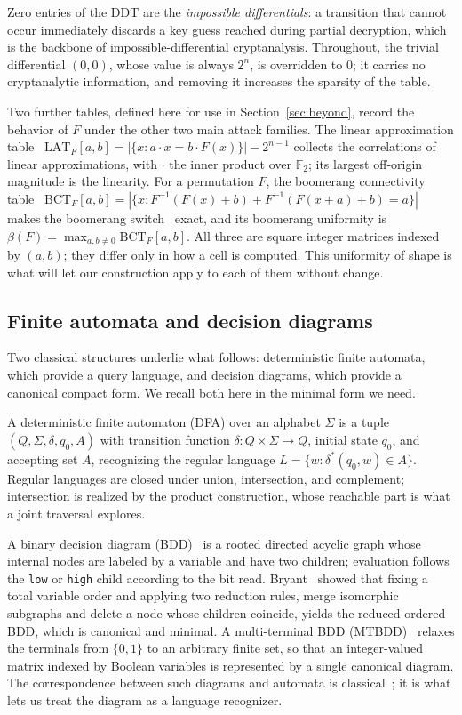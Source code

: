 \documentclass[runningheads]{llncs}
\newcommand{\F}{\mathbb{F}}
\newcommand{\LAT}{\mathrm{LAT}}
\newcommand{\BCT}{\mathrm{BCT}}
\newcommand{\Sig}{\Sigma}
\begin{document}
Zero entries of the DDT are the \emph{impossible differentials}: a transition that
cannot occur immediately discards a key guess reached during partial decryption,
which is the backbone of impossible-differential cryptanalysis. Throughout, the
trivial differential $(0,0)$, whose value is always $2^{n}$, is overridden to $0$;
it carries no cryptanalytic information, and removing it increases the sparsity of
the table.

Two further tables, defined here for use in Section~\ref{sec:beyond}, record the
behavior of $F$ under the other two main attack families. The linear
approximation table~\cite{matsuilc} $\LAT_F[a,b]=|\{x:a\cdot x=b\cdot
F(x)\}|-2^{n-1}$ collects the correlations of linear approximations, with $\cdot$
the inner product over $\F_2$; its largest off-origin magnitude is the linearity.
For a permutation $F$, the boomerang connectivity table~\cite{bct}
$\BCT_F[a,b]=|\{x:F^{-1}(F(x)+b)+F^{-1}(F(x+a)+b)=a\}|$ makes the boomerang
switch~\cite{wagner} exact, and its boomerang uniformity is
$\beta(F)=\max_{a,b\neq 0}\BCT_F[a,b]$. All three are square integer matrices
indexed by $(a,b)$; they differ only in how a cell is computed. This uniformity
of shape is what will let our construction apply to each of them without change.

\subsection{Finite automata and decision diagrams}

Two classical structures underlie what follows: deterministic finite automata,
which provide a query language, and decision diagrams, which provide a canonical
compact form. We recall both here in the minimal form we need.

A deterministic finite automaton (DFA) over an alphabet $\Sig$ is a tuple
$(Q,\Sig,\delta,q_0,A)$ with transition function $\delta:Q\times\Sig\to Q$,
initial state $q_0$, and accepting set $A$, recognizing the regular language
$L=\{w:\delta^{*}(q_0,w)\in A\}$. Regular languages are closed under union,
intersection, and complement; intersection is realized by the product
construction, whose reachable part is what a joint traversal explores.

A binary decision diagram (BDD)~\cite{lee,akers} is a rooted directed acyclic
graph whose internal nodes are labeled by a variable and have two children;
evaluation follows the \texttt{low} or \texttt{high} child according to the bit
read. Bryant~\cite{bryant} showed that fixing a total variable order and applying
two reduction rules, merge isomorphic subgraphs and delete a node whose children
coincide, yields the reduced ordered BDD, which is canonical and minimal. A
multi-terminal BDD (MTBDD)~\cite{mtbdd} relaxes the terminals from $\{0,1\}$ to an
arbitrary finite set, so that an integer-valued matrix indexed by Boolean
variables is represented by a single canonical diagram. The correspondence between
such diagrams and automata is classical~\cite{kimura}; it is what lets us treat
the diagram as a language recognizer.
\end{document}
